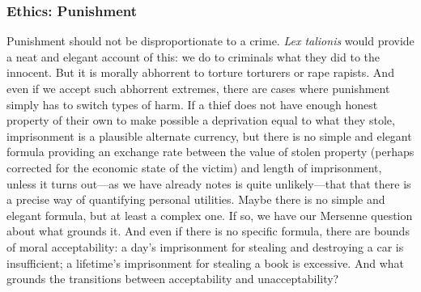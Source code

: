 \subsubsection{Ethics: Punishment}
Punishment should not be disproportionate to a crime. \textit{Lex talionis} would provide a neat and elegant account
of this: we do to criminals what they did to the innocent. But it is morally abhorrent to torture torturers or rape rapists. And even if we accept such
abhorrent extremes, there are cases where punishment simply has to switch types of harm. If a thief does not have enough
honest property of their own to make possible a deprivation equal to what they stole, imprisonment is a plausible alternate currency,
but there is no simple and elegant formula providing an exchange rate between the value of stolen property (perhaps
corrected for the economic state of the victim) and length of imprisonment, unless it turns out---as we have already
notes is quite unlikely---that 
that there is a precise way of quantifying personal utilities. Maybe there is no simple and elegant formula, but at least
a  complex one. If so, we have our Mersenne question about what grounds it. And even if there is no specific formula, there are bounds of moral acceptability: a day's imprisonment for stealing and destroying a car is insufficient; 
a lifetime's imprisonment for stealing a book is excessive. And what grounds the transitions between acceptability
and unacceptability?

